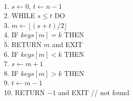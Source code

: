\begin{figure}
\begin{algt}
\label{algo:analysis-bin-search}
\\
1.\settowidth{\algbackindent}{1.}\hspace*{-\algbackindent}\hspace*{0.2in} $s\leftarrow 0$, $t\leftarrow n-1$\\
2.\settowidth{\algbackindent}{2.}\hspace*{-\algbackindent}\hspace*{0.2in} WHILE $s\leq t$ DO\\
3.\settowidth{\algbackindent}{3.}\hspace*{-\algbackindent}\hspace*{0.2in}\hspace*{0.2in} $m\leftarrow \lfloor (s+t)/2\rfloor$\\
4.\settowidth{\algbackindent}{4.}\hspace*{-\algbackindent}\hspace*{0.2in}\hspace*{0.2in} IF $keys[m] = k$ THEN\\
5.\settowidth{\algbackindent}{5.}\hspace*{-\algbackindent}\hspace*{0.2in}\hspace*{0.2in}\hspace*{0.2in} RETURN $m$ and EXIT\\
6.\settowidth{\algbackindent}{6.}\hspace*{-\algbackindent}\hspace*{0.2in}\hspace*{0.2in} IF $keys[m] < k$ THEN\\
7.\settowidth{\algbackindent}{7.}\hspace*{-\algbackindent}\hspace*{0.2in}\hspace*{0.2in}\hspace*{0.2in} $s\leftarrow m+1$\\
8.\settowidth{\algbackindent}{8.}\hspace*{-\algbackindent}\hspace*{0.2in}\hspace*{0.2in} IF $keys[m] > k$ THEN\\
9.\settowidth{\algbackindent}{9.}\hspace*{-\algbackindent}\hspace*{0.2in}\hspace*{0.2in}\hspace*{0.2in} $t\leftarrow m-1$\\
10.\settowidth{\algbackindent}{10.}\hspace*{-\algbackindent}\hspace*{0.2in} RETURN $-1$ and EXIT   // not found
\end{algt}
\end{figure}

